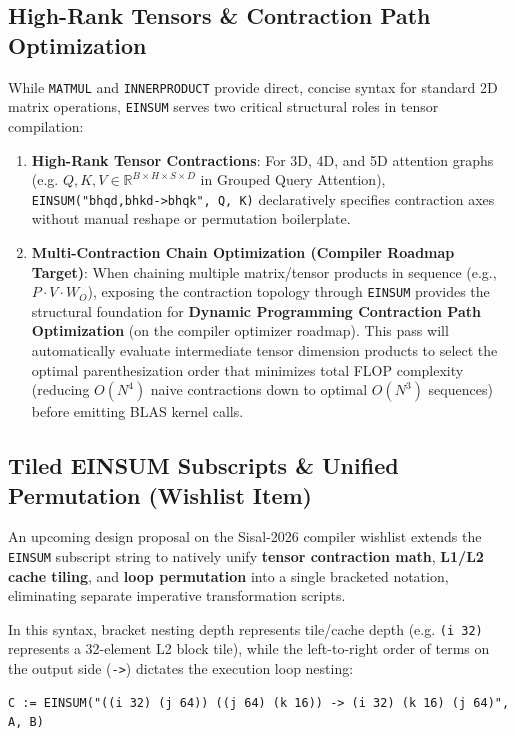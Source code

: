 \subsection{High-Rank Tensors \& Contraction Path Optimization}
While \texttt{MATMUL} and \texttt{INNERPRODUCT} provide direct, concise syntax for standard 2D matrix operations, \texttt{EINSUM} serves two critical structural roles in tensor compilation:
\begin{enumerate}
    \item \textbf{High-Rank Tensor Contractions}: For 3D, 4D, and 5D attention graphs (e.g. $Q, K, V \in \mathbb{R}^{B \times H \times S \times D}$ in Grouped Query Attention), \texttt{EINSUM("bhqd,bhkd->bhqk", Q, K)} declaratively specifies contraction axes without manual reshape or permutation boilerplate.
    \item \textbf{Multi-Contraction Chain Optimization (Compiler Roadmap Target)}: When chaining multiple matrix/tensor products in sequence (e.g., $P \cdot V \cdot W_O$), exposing the contraction topology through \texttt{EINSUM} provides the structural foundation for \textbf{Dynamic Programming Contraction Path Optimization} (on the compiler optimizer roadmap). This pass will automatically evaluate intermediate tensor dimension products to select the optimal parenthesization order that minimizes total FLOP complexity (reducing $O(N^4)$ naive contractions down to optimal $O(N^3)$ sequences) before emitting BLAS kernel calls.
\end{enumerate}

\subsection{Tiled EINSUM Subscripts \& Unified Permutation (Wishlist Item)}
An upcoming design proposal on the Sisal-2026 compiler wishlist extends the \texttt{EINSUM} subscript string to natively unify \textbf{tensor contraction math}, \textbf{L1/L2 cache tiling}, and \textbf{loop permutation} into a single bracketed notation, eliminating separate imperative transformation scripts.

In this syntax, bracket nesting depth represents tile/cache depth (e.g. \texttt{(i 32)} represents a 32-element L2 block tile), while the left-to-right order of terms on the output side (\texttt{->}) dictates the execution loop nesting:

\begin{lstlisting}[language=Sisal,caption={Tiled EINSUM Subscript with Middle $k$ Loop}]
% Tiled Matrix Multiplication (32x64x16) with k as Middle Loop
C := EINSUM("((i 32) (j 64)) ((j 64) (k 16)) -> (i 32) (k 16) (j 64)", A, B)
\end{lstlisting}


